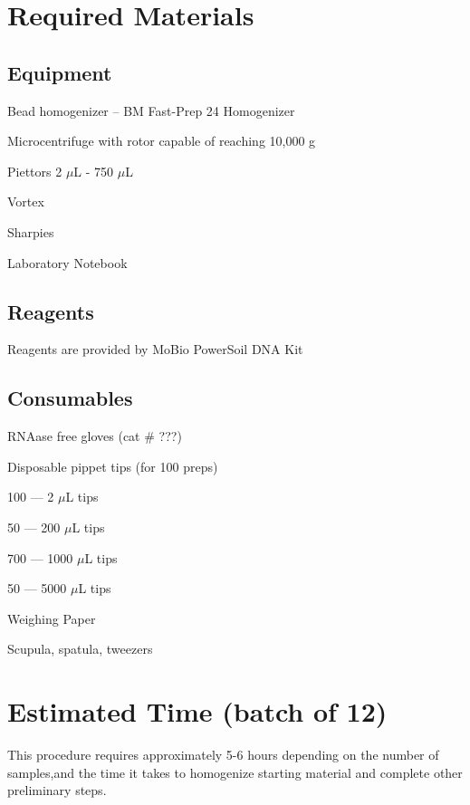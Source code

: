 \documentclass[12pt]{../SOP3_alpha}\usepackage[]{graphicx}\usepackage[]{color}
\begin{document}
\section{Required Materials}

\subsection*{Equipment}

\NP Bead homogenizer -- BM Fast-Prep 24 Homogenizer

\NP Microcentrifuge with rotor capable of reaching 10,000 g

\NP Piettors 2 $\mu$L - 750 $\mu$L

\NP Vortex

\NP Sharpies

\NP Laboratory Notebook

\subsection*{Reagents}

\NP Reagents are provided by MoBio PowerSoil DNA Kit 

\subsection*{Consumables}

\NP RNAase free gloves (cat \# ???)

\NP Disposable pippet tips (for 100 preps) 

\begin{itemize*}
  \item 100 --- 2 $\mu$L tips
  \item 50 --- 200 $\mu$L tips
  \item 700 --- 1000 $\mu$L tips
  \item 50 --- 5000 $\mu$L tips
\end{itemize*}

\NP Weighing Paper

\NP Scupula, spatula, tweezers

\section{Estimated Time (batch of 12)}

\NP This procedure requires approximately 5-6 hours depending on the number of samples,and the time it takes to homogenize starting material and complete other preliminary steps.
\end{document}
